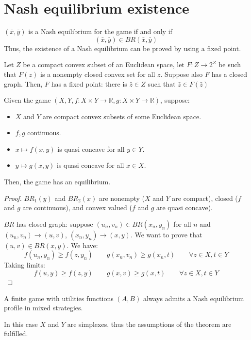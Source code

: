 \section{Nash equilibrium existence}

$(\bar{x},\bar{y})$ is a Nash equilibrium for the game if and only if 
\[(\bar{x},\bar{y})\in BR(\bar{x},\bar{y})\]
\noindent Thus, the existence of a Nash equilibrium can be proved by using a fixed point. 

\begin{theorem}
    Let $Z$ be a compact convex subset of an Euclidean space, let $F:Z\rightarrow 2^Z$ be such that $F(z)$ is a nonempty closed convex set for all $z$. 
    Suppose also $F$ has a closed graph. 
    Then, $F$ has a fixed point: there is $\bar{z} \in Z$ such that $\bar{z}\in F(\bar{z})$
\end{theorem}

\begin{theorem}
    Given the game $(X,Y,f:X\times Y \rightarrow \mathbb{R}, g:X\times Y \rightarrow \mathbb{R})$, suppose:
    \begin{itemize}
        \item $X$ and $Y$ are compact convex subsets of some Euclidean space. 
        \item $f,g$ continuous. 
        \item $x\mapsto f(x,y)$ is quasi concave for all $y\in Y$. 
        \item $y\mapsto g(x,y)$ is quasi concave for all $x\in X$. 
    \end{itemize}
    Then, the game has an equilibrium. 
\end{theorem}
\begin{proof}
    $BR_1(y)$ and $BR_2(x)$ are nonempty ($X$ and $Y$ are compact), closed ($f$ and $g$ are continuous), and convex valued ($f$ and $g$ are quasi concave). 
    
    $BR$ has closed graph: suppose $(u_n,v_n)\in BR(x_n,y_n)$ for all $n$ and $(u_n,v_n)\rightarrow (u,v)$, $(x_n,y_n)\rightarrow (x,y)$. 
    We want to prove that $(u,v)\in BR(x,y)$. 
    We have: 
    \[f(u_n,y_n)\geq f(z,y_n)\qquad g(x_n,v_n)\geq g(x_n,t)\qquad\forall z\in X, t\in Y\]
    Taking limits: 
    \[f(u,y)\geq f(z,y)\qquad g(x,v)\geq g(x,t)\qquad\forall z\in X, t\in Y\]
\end{proof}
\begin{corollary}
    A finite game with utilities functions $(A,B)$ always admits a Nash equilibrium profile in mixed strategies. 
\end{corollary}
\noindent In this case $X$ and $Y$ are simplexes, thus the assumptions of the theorem are fulfilled. 